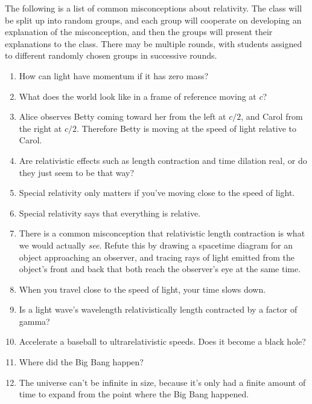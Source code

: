 The following is a list of common misconceptions about relativity. The class
will be split up into random groups, and each group will cooperate on developing
an explanation of the misconception, and then the groups will present their explanations
to the class. There may be multiple rounds, with students assigned to different
randomly chosen groups in successive rounds.

\begin{enumerate}

\item
  How can light have momentum if it has zero mass?

\item
  What does the world look like in a frame of reference moving at $c$?

\item
  Alice observes Betty coming toward her from the left at $c/2$, and  
  Carol from the right at $c/2$. Therefore Betty is moving at the speed
  of light relative to Carol.

\item
  Are relativistic effects such as length contraction and time
  dilation real, or do they just seem to be that way?

\item
  Special relativity only matters if you've moving close to the
  speed of light.

\item
  Special relativity says that everything is relative.

\item
  There is a common misconception that relativistic length contraction
  is what we would actually \emph{see}. Refute this by drawing a spacetime
  diagram for an object approaching an observer, and tracing rays of
  light emitted from the object's front and back that both reach the
  observer's eye at the same time.

\item
  When you travel close to the speed of light, your time slows down.

\item
  Is a light wave's wavelength relativistically length contracted by
  a factor of gamma?

\item
  Accelerate a baseball to ultrarelativistic speeds. Does it become a
  black hole?

\item
  Where did the Big Bang happen?

\item
  The universe can't be infinite in size, because it's only had a
  finite amount of time to expand from the point where the Big Bang
  happened.

\end{enumerate}
